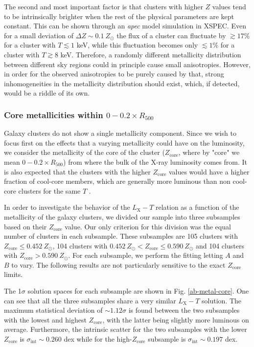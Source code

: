 \documentclass{aa}   %
\begin{document}
The second and most important factor is that clusters with higher $Z$ values tend to be intrinsically brighter when the rest of the physical parameters are kept constant. This can be shown through an \textit{apec} model simulation in XSPEC. Even for a small deviation of $\Delta Z\sim 0.1\ Z_{\odot}$ the flux of a cluster can fluctuate by $\gtrsim 17\%$ for a cluster with $T\lesssim 1$ keV, while this fluctuation becomes only $\lesssim 1\%$ for a cluster with $T\gtrsim 8$ keV. Therefore, a randomly different metallicity distribution between different sky regions could in principle cause small anisotropies. However, in order for the observed anisotropies to be purely caused by that, strong inhomogeneities in the metallicity distribution should exist, which, if detected, would be a riddle of its own.

\subsubsection{Core metallicities within $0-0.2\times R_{500}$}

Galaxy clusters do not show a single metallicity component. Since we wish to focus first on the effects that a varying metallicity could have on the luminosity, we consider the metallicity of the core of the cluster ($Z_{\text{core}}$, where by "core" we mean $0-0.2\times R_{500}$) from where the bulk of the X-ray luminosity comes from. It is also expected that the clusters with the higher $Z_{\text{core}}$ values would have a higher fraction of cool-core members, which are generally more luminous than non cool-core clusters for the same $T$ \citep[e.g.,][]{mittal}.

In order to investigate the behavior of the $L_{\text{X}}-T$ relation as a function of the metallicity of the galaxy clusters, we divided our sample into three subsamples based on their $Z_{\text{core}}$ value. Our only criterion for this division was the equal number of clusters in each subsample. These subsamples are 105 clusters with $Z_{\text{core}}\leq 0.452\ Z_{\odot}$, 104 clusters with $0.452\ Z_{\odot}<Z_{\text{core}}\leq 0.590\ Z_{\odot}$ and 104 clusters with $Z_{\text{core}}>0.590\ Z_{\odot}$. For each subsample, we perform the fitting letting $A$ and $B$ to vary. The following results are not particularly sensitive to the exact $Z_{\text{core}}$ limits. 

The 1$\sigma$ solution spaces for each subsample are shown in Fig. \ref{ab-metal-core}. One can see that all the three subsamples share a very similar $L_{\text{X}}-T$ solution. The maximum statistical deviation of $\sim 1.12\sigma$ is found between the two subsamples with the lowest and highest $Z_{\text{core}}$, with the latter being slightly more luminous on average. Furthermore, the intrinsic scatter for the two subsamples with the lower $Z_{\text{core}}$ is $\sigma_{\text{int}}\sim 0.260$ dex while for the high-$Z_{\text{core}}$ subsample is $\sigma_{\text{int}}\sim 0.197$ dex.
\end{document}
